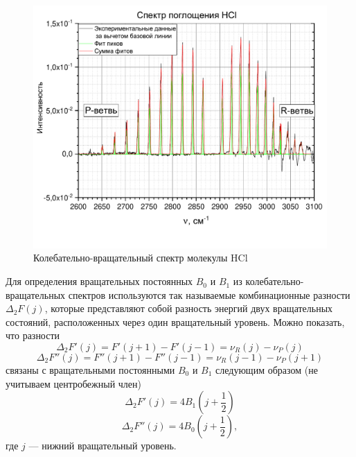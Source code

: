\begin{figure}[H]
	\centering
	\includegraphics[angle = 90, height=0.88\textheight]{data/HCL_peaks}
	\caption{Колебательно-вращательный спектр молекулы HCl}
	\label{HCL_spec}
\end{figure}


Для определения вращательных постоянных $B_0$ и $B_1$ из
колебательно-вращательных спектров используются так называемые
комбинационные разности $\Delta_2F(j)$, которые представляют собой разность энергий двух вращательных состояний, расположенных через
один вращательный уровень. Можно показать, что разности
\begin{equation}
\label{eq:deltaF'}
\Delta_2F'(j)=F'(j+1)-F'(j-1)=\nu_R(j)-\nu_P(j)
\end{equation}
\begin{equation}
\label{eq:deltaF''}
\Delta_2F''(j)=F''(j+1)-F''(j-1)=\nu_R(j-1)-\nu_P(j+1)
\end{equation}
связаны с вращательными постоянными $B_0$ и $B_1$ следующим образом (не учитываем центробежный член)
\begin{equation}
\label{eq:deltaF'B}
\Delta_2F'(j)=4B_1(j+\frac{1}{2})
\end{equation}
\begin{equation}
\label{eq:deltaF''B}
\Delta_2F''(j)=4B_0(j+\frac{1}{2}),
\end{equation}
где $j$ --- нижний вращательный уровень.

